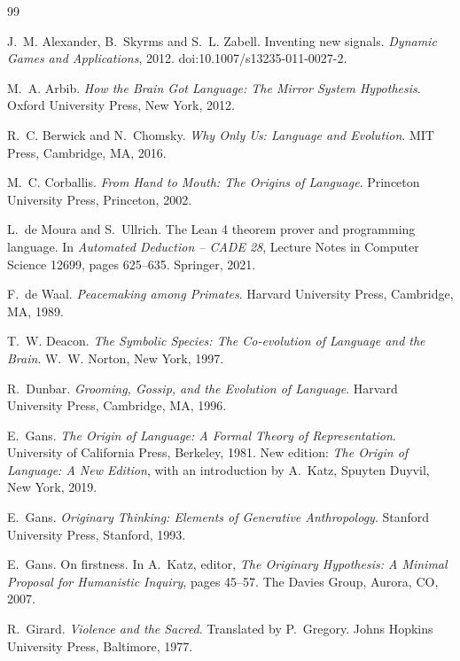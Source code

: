 \documentclass[11pt]{article}
\begin{document}
\begin{thebibliography}{99}

J.~M. Alexander, B.~Skyrms and S.~L. Zabell.
\newblock Inventing new signals.
\newblock \emph{Dynamic Games and Applications}, 2012.
\newblock doi:10.1007/s13235-011-0027-2.

M.~A. Arbib.
\newblock \emph{How the Brain Got Language: The Mirror System Hypothesis}.
\newblock Oxford University Press, New York, 2012.

R.~C. Berwick and N.~Chomsky.
\newblock \emph{Why Only Us: Language and Evolution}.
\newblock MIT Press, Cambridge, MA, 2016.

M.~C. Corballis.
\newblock \emph{From Hand to Mouth: The Origins of Language}.
\newblock Princeton University Press, Princeton, 2002.

L.~de Moura and S.~Ullrich.
\newblock The Lean 4 theorem prover and programming language.
\newblock In \emph{Automated Deduction -- CADE 28}, Lecture Notes in Computer
  Science 12699, pages 625--635. Springer, 2021.

F.~de Waal.
\newblock \emph{Peacemaking among Primates}.
\newblock Harvard University Press, Cambridge, MA, 1989.

T.~W. Deacon.
\newblock \emph{The Symbolic Species: The Co-evolution of Language and the Brain}.
\newblock W.~W. Norton, New York, 1997.

R.~Dunbar.
\newblock \emph{Grooming, Gossip, and the Evolution of Language}.
\newblock Harvard University Press, Cambridge, MA, 1996.

E.~Gans.
\newblock \emph{The Origin of Language: A Formal Theory of Representation}.
\newblock University of California Press, Berkeley, 1981.
\newblock New edition: \emph{The Origin of Language: A New Edition}, with an
  introduction by A.~Katz, Spuyten Duyvil, New York, 2019.

E.~Gans.
\newblock \emph{Originary Thinking: Elements of Generative Anthropology}.
\newblock Stanford University Press, Stanford, 1993.

E.~Gans.
\newblock On firstness.
\newblock In A.~Katz, editor, \emph{The Originary Hypothesis: A Minimal Proposal for
  Humanistic Inquiry}, pages 45--57. The Davies Group, Aurora, CO, 2007.

R.~Girard.
\newblock \emph{Violence and the Sacred}.
\newblock Translated by P.~Gregory. Johns Hopkins University Press, Baltimore, 1977.


\end{thebibliography}
\end{document}
